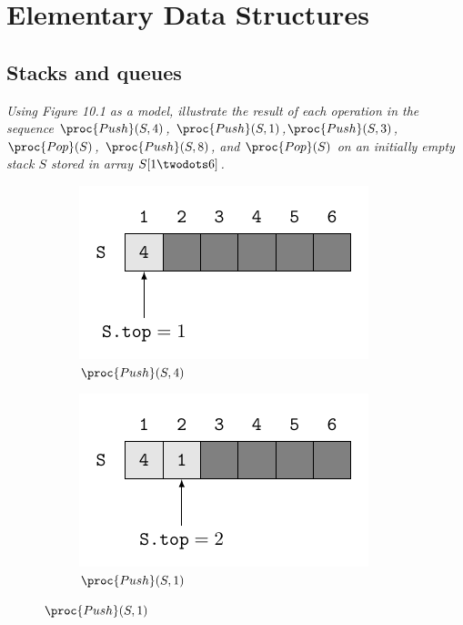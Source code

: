 \section{Elementary Data Structures}
\subsection{Stacks and queues}
\label{sub:stacks_and_queues}



\begin{description}

 \textit{Using Figure 10.1 as a model, illustrate the result of each operation in the sequence $\proc{Push}(S,4)$, $\proc{Push}(S,1)$,$\proc{Push}(S,3)$, $\proc{Pop}(S)$, $\proc{Push}(S,8)$, and $\proc{Pop}(S)$  on an initially empty stack $S$ stored in array $S[1 \twodots6]$.}
\begin{ex}
    \begin{figure}[H]
      \centering
      \begin{subfigure}[t]{.45\textwidth}
        \centering
        \includegraphics[scale=1]{img/10_1-1/10_1-1_1.pdf}
        \caption{$\proc{Push}(S,4)$}\label{fig:10_1-1_1}
      \end{subfigure}
      \begin{subfigure}[t]{.45\textwidth}
        \centering
        \includegraphics[scale=1]{img/10_1-1/10_1-1_2.pdf}
        \caption{$\proc{Push}(S,1)$}\label{fig:10_1-1_2}
      \end{subfigure}

\end{figure}
\end{ex}
\end{description}
